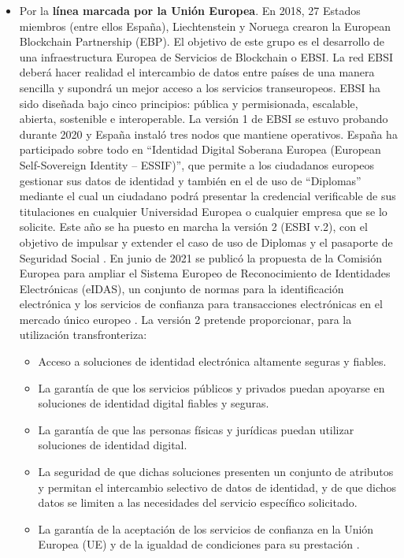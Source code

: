 \begin{itemize}
    \item Por la \textbf{línea marcada por la Unión Europea}. En 2018, 27 Estados miembros (entre ellos España), Liechtenstein y Noruega crearon la European Blockchain Partnership (EBP). El objetivo de este grupo es el desarrollo de una infraestructura Europea de Servicios de Blockchain o EBSI. La red EBSI deberá hacer realidad el intercambio de datos entre países de una manera sencilla y supondrá un mejor acceso a los servicios transeuropeos. EBSI ha sido diseñada bajo cinco principios: pública y permisionada, escalable, abierta, sostenible e interoperable. La versión 1 de EBSI se estuvo probando durante 2020 y España instaló tres nodos que mantiene operativos. España ha participado sobre todo en “Identidad Digital Soberana Europea (European Self-Sovereign Identity – ESSIF)”, que permite a los ciudadanos europeos gestionar sus datos de identidad y también en el de uso de “Diplomas” mediante el cual un ciudadano podrá presentar la credencial verificable de sus titulaciones en cualquier Universidad Europea o cualquier empresa que se lo solicite. Este año se ha puesto en marcha la versión 2 (ESBI v.2), con el objetivo de impulsar y extender el caso de uso de Diplomas y el pasaporte de Seguridad Social \cite{web:EBSI}. En junio de 2021 se publicó la propuesta de la Comisión Europea para ampliar el Sistema Europeo de Reconocimiento de Identidades Electrónicas (eIDAS), un conjunto de normas para la identificación electrónica y los servicios de confianza para transacciones electrónicas en el mercado único europeo \cite{web:eIDAS}. La versión 2 pretende proporcionar, para la utilización transfronteriza:
    \begin{itemize}
        \item Acceso a soluciones de identidad electrónica altamente seguras y fiables.
        \item La garantía de que los servicios públicos y privados puedan apoyarse en soluciones de identidad digital fiables y seguras.
        \item La garantía de que las personas físicas y jurídicas puedan utilizar soluciones de identidad digital.
        \item La seguridad de que dichas soluciones presenten un conjunto de atributos y permitan el intercambio selectivo de datos de identidad, y de que dichos datos se limiten a las necesidades del servicio específico solicitado.
        \item La garantía de la aceptación de los servicios de confianza en la Unión Europea (UE) y de la igualdad de condiciones para su prestación \cite{web:CE}.
    \end{itemize}

\end{itemize}

\newpage
\thispagestyle{empty}